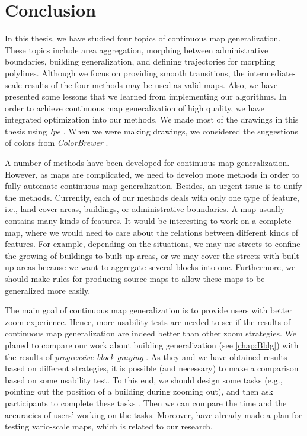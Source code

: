 \chapter{Conclusion}
\label{chap:Conclusion}

In this thesis, we have studied four topics of 
continuous map generalization.
These topics include area aggregation, 
morphing between administrative boundaries,
building generalization, and
defining trajectories for morphing polylines.
Although we focus on providing smooth transitions,
the intermediate-scale results of the four methods
may be used as valid maps.
Also, we have presented some lessons that 
we learned from implementing our algorithms.
In order to achieve continuous map generalization 
of high quality, 
we have integrated optimization into our methods.
%
We made most of the drawings in this thesis
using \emph{Ipe} \parencite[see][]{Schwarzkopf1995Ipe}.
When we were making drawings,
we considered the suggestions of colors 
from \emph{ColorBrewer} 
\parencite[see][]{Harrower2003ColorBrewer,Brewer2003Print}.

A number of methods have been developed for
continuous map generalization.
However, as maps are complicated,
we need to develop more methods 
in order to fully automate continuous map generalization.
Besides, an urgent issue is to unify the methods.
Currently, each of our methods deals with 
only one type of feature, i.e., 
land-cover areas, buildings, or administrative boundaries.
A map usually contains many kinds of features.
It would be interesting to work on a complete map,
where we would need to care about the relations 
between different kinds of features.
For example, depending on the situations, 
we may use streets to confine the growing of 
buildings to built-up areas, 
or we may cover the streets with built-up areas 
because we want to aggregate several blocks into one.
Furthermore, we should make rules for producing source maps
to allow these maps to be generalized more easily.

The main goal of continuous map generalization is to provide 
users with better zoom experience.
Hence, more usability tests are needed to see 
if the results of continuous map generalization 
are indeed better than other zoom strategies.
We planed to compare our work about building generalization 
(see \chap\ref{chap:Bldg}) 
with the results of \emph{progressive block graying} 
\parencite[see][]{Touya2017Progressive}.
As they and we have obtained results 
based on different strategies, 
it is possible (and necessary) to make a comparison 
based on some usability test.
To this end, we should design some tasks 
(e.g., pointing out the 
position of a building during zooming out), 
and then ask participants to complete these tasks
\parencite[e.g.,][]{Midtbo2007}.
Then we can compare the time and the accuracies
of users' working on the tasks.
Moreover, \textcite{Suba2016Usability} 
have already made a plan for 
testing vario-scale maps, which is related to our research.


